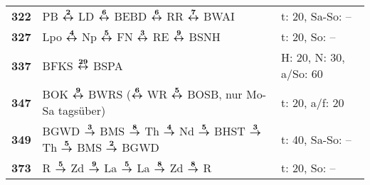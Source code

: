 \begin{minipage}[t]{0.45\textwidth}
\begin{tabular}{>{\bfseries}L{1.2cm}L{9.0cm}L{3.0cm}}
\bus{} 322    & PB $\xarwe{2}$ LD $\xarwe{6}$ BEBD $\xarwe{6}$ RR $\xarwe{7}$ BWAI                                                                                                  & t: 20, Sa-So: --           \\
\bus{} 327    & Lpo $\xarwe{4}$ Np $\xarwe{5}$ FN $\xarwe{3}$ RE $\xarwe{9}$ BSNH                                                                                                   & t: 20, So: --              \\
\bus{} 337    & BFKS $\xarwe{29}$ BSPA                                                                                                                                              & H: 20, N: 30, a/So: 60     \\
\bus{} 347    & BOK $\xarwe{9}$ BWRS ($\xarwe{6}$ WR $\xarwe{5}$ BOSB, nur Mo-Sa tagsüber)                                                                                          & t: 20, a/f: 20             \\
\bus{} 349    & BGWD $\xarre{3}$ BMS $\xarre{8}$ Th $\xarre{4}$ Nd $\xarre{5}$ BHST $\xarre{3}$ Th $\xarre{5}$ BMS $\xarre{2}$ BGWD                                                 & t: 40, Sa-So: --           \\
\bus{} 373    & R $\xarre{5}$ Zd $\xarre{9}$ La $\xarre{5}$ La $\xarre{8}$ Zd $\xarre{8}$ R                                                                                         & t: 20, So: --              \\
\hline
\end{tabular}
\end{minipage}
